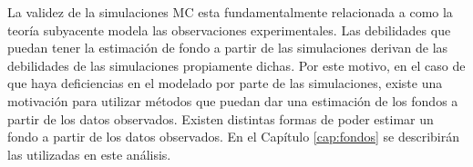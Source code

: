 






La validez de la simulaciones MC esta fundamentalmente relacionada a como la
teoría subyacente modela las observaciones experimentales. Las debilidades que
puedan tener la estimación de fondo a partir de las simulaciones derivan de las
debilidades de las simulaciones propiamente dichas. Por este motivo, en el caso
de que haya deficiencias en el modelado por parte de las simulaciones, existe
una motivación para utilizar métodos que puedan dar una estimación de los fondos
a partir de los datos observados. Existen distintas formas de poder estimar un
fondo a partir de los datos observados. En el Capítulo \ref{cap:fondos} se
describirán las utilizadas en este análisis.


